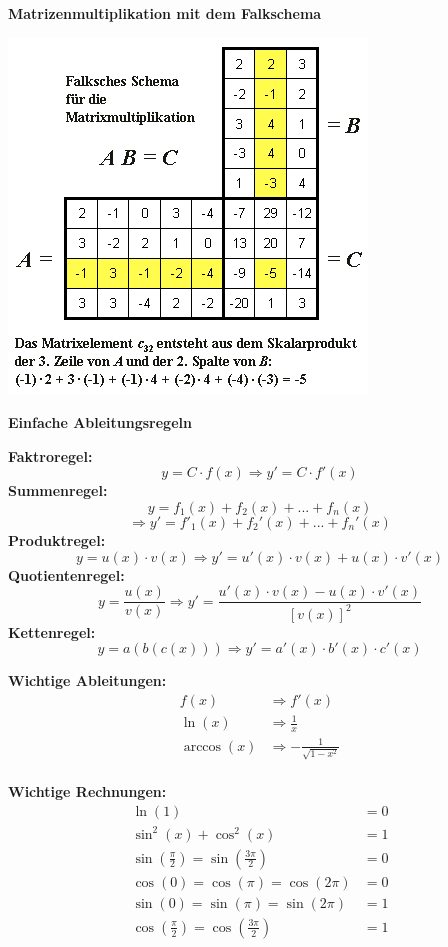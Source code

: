 \documentclass[fontset=ubuntu,12pt,a4paper,fleqn]{article}
\begin{document}
{\Large\textbf{Matrizenmultiplikation mit dem Falkschema}\par}

\setlength{\columnseprule}{0.4pt}
\begin{multicols}{2}

\includegraphics[width=0.7\linewidth]{FalkschesSchema.png}

{\Large\textbf{Einfache Ableitungsregeln}\par}

\textbf{Faktroregel:}
\[
y= C\cdot f(x) \Rightarrow y'= C\cdot f'(x)
\]
\textbf{Summenregel:}
\[
y= f_1(x) + f_2(x) + ... + f_n(x)  
\]\[
\Rightarrow y'=f'_1(x) + f_2'(x) + ... + f_n'(x)
\]
\textbf{Produktregel:}
\[
y= u(x) \cdot v(x) \Rightarrow y'=u'(x) \cdot v(x) + u(x) \cdot v'(x)
\]
\textbf{Quotientenregel:}
\[
y= \frac{u(x)}{v(x)} \Rightarrow y'=\frac{u'(x) \cdot v(x) - u(x) \cdot v'(x)}{[v(x)]^2}
\]
\textbf{Kettenregel:}
\[
y=a(b(c(x))) \Rightarrow y'= a'(x) \cdot b'(x) \cdot c'(x)
\]

\textbf{Wichtige Ableitungen:}
\begin{align*}
	f(x) &\Rightarrow f'(x)\\
	\ln(x) &\Rightarrow \frac{1}{x}\\
	\arccos(x) &\Rightarrow -\frac{1}{\sqrt{1-x^2}}\\
\end{align*}

\textbf{Wichtige Rechnungen:}
\begin{align*}
	\ln(1) &=0\\
	\sin^2(x)+\cos^2(x)&=1\\
	\sin\left(\frac{\pi}{2}\right) = \sin\left(\frac{3\pi}{2}\right) &=0\\
	\cos(0) = \cos(\pi) = \cos(2\pi)&=0\\
	\sin(0) = \sin(\pi) = \sin(2\pi)&=1\\
	\cos\left(\frac{\pi}{2}\right) = \cos\left(\frac{3\pi}{2}\right) &=1\\
\end{align*}


\end{multicols}
\end{document}
